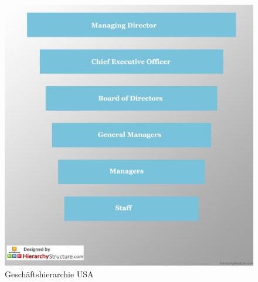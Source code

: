 \begin{figure}[ht]
\centering
\includegraphics[width=0.7\linewidth]{./images/USA-Business-Hierarchy}
\caption{Geschäftshierarchie USA \cite{HierarchieUSA}}
\label{fig:USA-Business-Hierarchy}
\end{figure}

